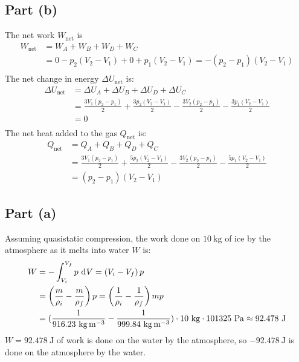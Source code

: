 \documentclass{article}
\begin{document}
\subsection*{Part (b)}
The net work $W_{\text{net}}$ is
\begin{equation}
    \begin{split}
        W_{\text{net}} & = W_A + W_B + W_D + W_C \\
        & = 0 - p_2\left(V_2 - V_1\right) + 0 + p_1\left(V_2 - V_1\right) = -\left(p_2 - p_1\right)\left(V_2 - V_1\right) \\
    \end{split}
\end{equation}
The net change in energy $\Delta U_{\text{net}}$ is:
\begin{equation}
    \begin{split}
        \Delta U_{\text{net}} & = \Delta U_A + \Delta U_B + \Delta U_D + \Delta U_C \\
        & = \frac{3V_1\left(p_2 - p_1\right)}{2} + \frac{3p_2\left(V_2 - V_1\right)}{2} - \frac{3V_2\left(p_2 - p_1\right)}{2} - \frac{3p_1\left(V_2 - V_1\right)}{2} \\
        & = 0 \\
    \end{split}
\end{equation}
The net heat added to the gas $Q_{\text{net}}$ is:
\begin{equation}
    \begin{split}
        Q_{\text{net}} & = Q_A + Q_B + Q_D + Q_C \\
        & = \frac{3V_1\left(p_2 - p_1\right)}{2} + \frac{5p_2\left(V_2 - V_1\right)}{2} - \frac{3V_2\left(p_2 - p_1\right)}{2} - \frac{5p_1\left(V_2 - V_1\right)}{2} \\
        & = \left(p_2 - p_1\right)\left(V_2 - V_1\right)
    \end{split}
\end{equation}
\clearpage

\problem
\subsection*{Part (a)}
Assuming quasistatic compression, the work done on $10~\unit{\kilo\gram}$ of ice by the atmosphere as it melts into water $W$ is:
\begin{equation}
    \begin{split}
        W & = -\int_{V_i}^{V_f} p \, \diff{V} = \left(V_i - V_f\right)p \\
        & = \left(\frac{m}{\rho_i} - \frac{m}{\rho_f}\right)p = \left(\frac{1}{\rho_i} - \frac{1}{\rho_f}\right)mp \\
        & = (\frac{1}{916.23~\unit{\kilo\gram\per\meter\cubed}} - \frac{1}{999.84~\unit{\kilo\gram\per\meter\cubed}}) \cdot 10~\unit{\kilo\gram}\cdot 101325~\unit{\pascal}\approx 92.478~\unit{\joule}
    \end{split}
\end{equation}
$W = 92.478~\unit{\joule}$ of work is done on the water by the atmosphere, so $-92.478~\unit{\joule}$ is done on the atmosphere by the water.
\end{document}
